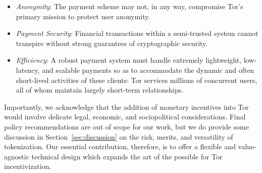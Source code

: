 \begin{itemize}
\item \emph{Anonymity}: The payment scheme may not, in any way, compromise Tor's
  primary mission to protect user anonymity.
\item \emph{Payment Security}: Financial transactions within a semi-trusted system
  cannot transpire without strong guarantees of cryptographic security.
\item \emph{Efficiency}: A robust payment system must handle extremely
  lightweight, low-latency, and scalable payments so as to accommodate
  the dynamic and often short-lived activities of these clients: Tor
  services millions of concurrent users, all of whom maintain largely
  short-term relationships.
\end{itemize}

Importantly, we acknowledge that the addition of monetary incentives into Tor
would involve delicate legal, economic, and sociopolitical considerations. Final
policy recommendations are out of scope for our work, but we do provide some
discussion in Section~\ref{sec:discussion} on the risk, merits, and versatility
of tokenization. Our essential contribution, therefore, is to offer a flexible
and value-agnostic technical design which expands the art of the possible for
Tor incentivization.


